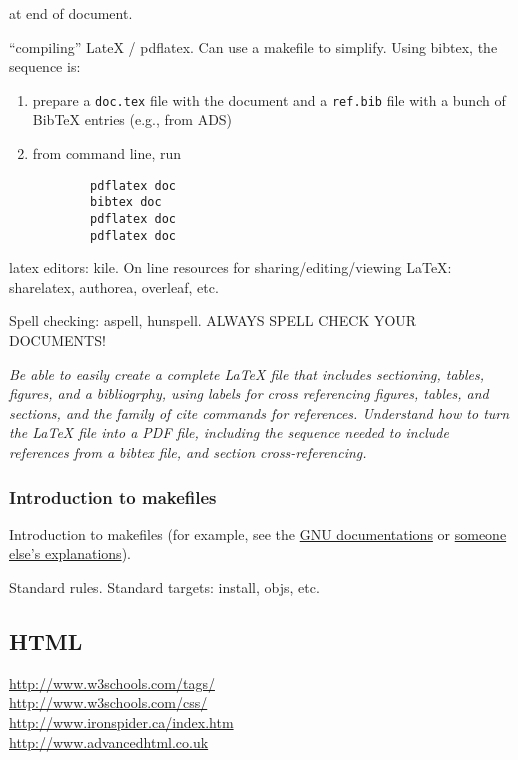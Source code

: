 \documentclass{article}
\newcommand{\test}[1]{%
    \begin{center}
        \colorbox{hl}{\parbox{0.9\textwidth}{\emph{\centering #1}}}
    \end{center}}
\begin{document}
\verb||  at end of document.

``compiling'' LateX / pdflatex. Can use a makefile to simplify. Using
bibtex, the sequence is:
\begin{enumerate}
    \item prepare a {\tt doc.tex} file with the document and a
        {\tt ref.bib} file with a bunch of BibTeX entries
        (e.g., from ADS)
    \item from command line, run
        \begin{verbatim}
        pdflatex doc
        bibtex doc
        pdflatex doc
        pdflatex doc
        \end{verbatim}
\end{enumerate}
latex editors: kile. On line resources for sharing/editing/viewing
LaTeX: sharelatex, authorea, overleaf, etc.

Spell checking: aspell, hunspell. ALWAYS SPELL CHECK YOUR DOCUMENTS!

\test{Be able to easily create a complete LaTeX file that includes
sectioning, tables, figures, and a bibliogrphy, using labels for cross
referencing figures, tables, and sections, and the family of cite
commands for references. Understand how to turn the LaTeX file into a
PDF file, including the sequence needed to include references from a
bibtex file, and section cross-referencing.}

\subsubsection{Introduction to makefiles}
Introduction to makefiles (for example, see the
\href{https://www.gnu.org/software/make/manual/html_node/index.html#Top}
{GNU documentations} or
\href{http://www.rsmas.miami.edu/personal/miskandarani/Courses/MSC321/make.pdf}
{someone else's explanations}).

Standard rules. Standard targets: install, objs, etc.

\subsection{HTML}

\url{http://www.w3schools.com/tags/}\\
\url{http://www.w3schools.com/css/}\\
\url{http://www.ironspider.ca/index.htm}\\
\url{http://www.advancedhtml.co.uk}\\
\end{document}
